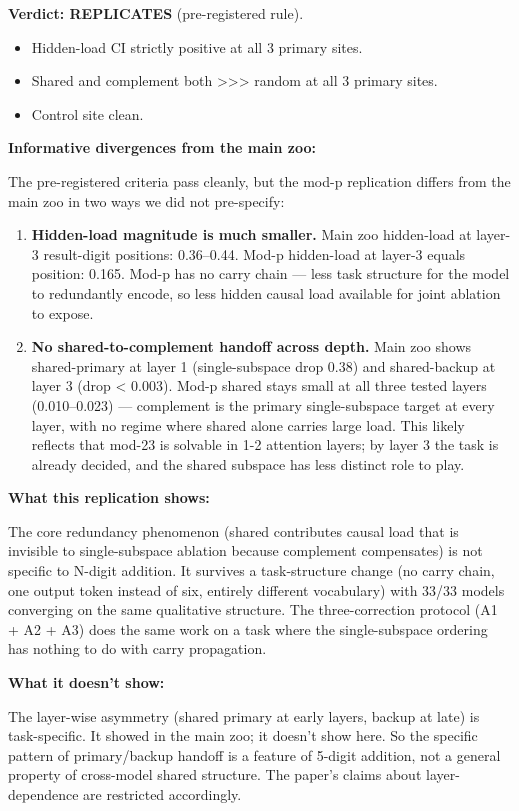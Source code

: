 \textbf{Verdict: REPLICATES} (pre-registered rule).

\begin{itemize}
  \item Hidden-load CI strictly positive at all 3 primary sites.
  \item Shared and complement both >>> random at all 3 primary sites.
  \item Control site clean.
\end{itemize}

\textbf{Informative divergences from the main zoo:}

The pre-registered criteria pass cleanly, but the mod-p replication
differs from the main zoo in two ways we did not pre-specify:

\begin{enumerate}
  \item \textbf{Hidden-load magnitude is much smaller.} Main zoo hidden-load at layer-3 result-digit positions: 0.36--0.44. Mod-p hidden-load at layer-3 equals position: 0.165. Mod-p has no carry chain --- less task structure for the model to redundantly encode, so less hidden causal load available for joint ablation to expose.
  \item \textbf{No shared-to-complement handoff across depth.} Main zoo shows shared-primary at layer 1 (single-subspace drop 0.38) and shared-backup at layer 3 (drop < 0.003). Mod-p shared stays small at all three tested layers (0.010--0.023) --- complement is the primary single-subspace target at every layer, with no regime where shared alone carries large load. This likely reflects that mod-23 is solvable in 1-2 attention layers; by layer 3 the task is already decided, and the shared subspace has less distinct role to play.
\end{enumerate}

\textbf{What this replication shows:}

The core redundancy phenomenon (shared contributes causal load that is
invisible to single-subspace ablation because complement compensates) is
not specific to N-digit addition. It survives a task-structure change
(no carry chain, one output token instead of six, entirely different
vocabulary) with 33/33 models converging on the same qualitative
structure. The three-correction protocol (A1 + A2 + A3) does the same
work on a task where the single-subspace ordering has nothing to do
with carry propagation.

\textbf{What it doesn't show:}

The layer-wise asymmetry (shared primary at early layers, backup at late)
is task-specific. It showed in the main zoo; it doesn't show here. So
the specific pattern of primary/backup handoff is a feature of 5-digit
addition, not a general property of cross-model shared structure. The
paper's claims about layer-dependence are restricted accordingly.

